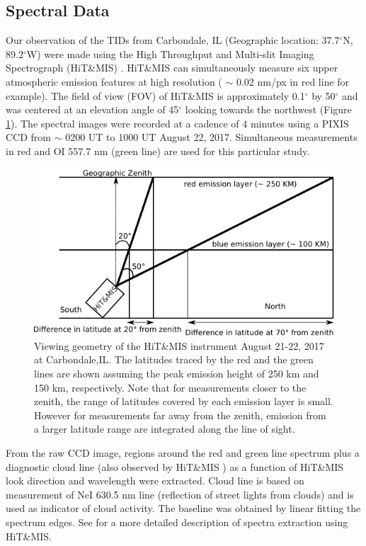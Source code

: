\subsection{Spectral Data}
Our observation of the TIDs from Carbondale, IL (Geographic location: 37.7$^\circ$N, 89.2$^\circ$W)  were made using the High Throughput and Multi-slit Imaging Spectrograph (HiT\&MIS) \citep{hitmis}. HiT\&MIS can simultaneously measure six upper atmospheric emission features at high resolution ( $\sim$ 0.02 nm/px in red line for example). The field of view (FOV) of HiT\&MIS is approximately 0.1$^\circ$ by 50$^\circ$ and was centered at an elevation angle of 45$^\circ$ looking towards the northwest (Figure \ref{fig:elayer}). The spectral images were recorded at a cadence of 4 minutes using a PIXIS CCD from $\sim$ 0200 UT to 1000 UT August 22, 2017.  Simultaneous measurements in red and OI 557.7 nm (green line) are used for this particular study. 
\begin{figure}
	\centering\includegraphics[width=35pc]{elayer.pdf}
	\caption{Viewing geometry of the HiT\&MIS instrument August 21-22, 2017 at Carbondale,IL. The latitudes traced by the red and the green lines are shown assuming the peak emission height of
		250 km and 150 km, respectively. Note that for measurements closer to the zenith, the range of latitudes covered by each emission layer is small. However for measurements far away from the zenith, emission from a larger latitude range are integrated along the line of sight.}
	\label{fig:elayer}
\end{figure}

From the raw CCD image, regions around the red and green line spectrum plus a diagnostic cloud line (also observed by HiT\&MIS ) as a function of HiT\&MIS look direction and wavelength were extracted.  Cloud line is based on measurement of NeI 630.5 nm line (reflection of street lights from clouds) and is used as indicator of cloud activity. The baseline was obtained by linear fitting the spectrum edges. See \citet{aryal_energy} for a more detailed description of spectra extraction using HiT\&MIS.

